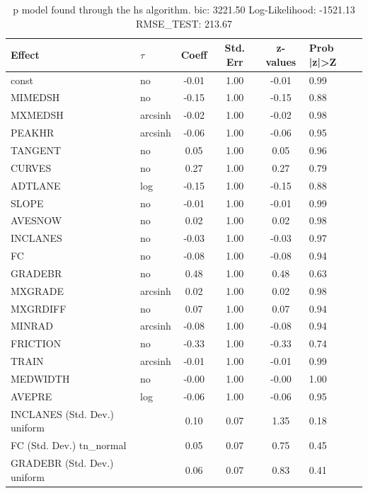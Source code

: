 \begin{table}
	\caption{p model found through the hs algorithm. bic: 3221.50 Log-Likelihood: -1521.13 RMSE_TEST: 213.67}
	\begin{center}
		\begin{tabular}{|l|l|c|c|c|l|}
			\hline
			Effect & $\tau$ & Coeff & Std. Err & z-values & Prob |z|>Z \\
			\hline
			const & no & -0.01 & 1.00 & -0.01 & 0.99 \\
			\hline
			MIMEDSH & no & -0.15 & 1.00 & -0.15 & 0.88 \\
			\hline
			MXMEDSH & arcsinh & -0.02 & 1.00 & -0.02 & 0.98 \\
			\hline
			PEAKHR & arcsinh & -0.06 & 1.00 & -0.06 & 0.95 \\
			\hline
			TANGENT & no & 0.05 & 1.00 & 0.05 & 0.96 \\
			\hline
			CURVES & no & 0.27 & 1.00 & 0.27 & 0.79 \\
			\hline
			ADTLANE & log & -0.15 & 1.00 & -0.15 & 0.88 \\
			\hline
			SLOPE & no & -0.01 & 1.00 & -0.01 & 0.99 \\
			\hline
			AVESNOW & no & 0.02 & 1.00 & 0.02 & 0.98 \\
			\hline
			INCLANES & no & -0.03 & 1.00 & -0.03 & 0.97 \\
			\hline
			FC & no & -0.08 & 1.00 & -0.08 & 0.94 \\
			\hline
			GRADEBR & no & 0.48 & 1.00 & 0.48 & 0.63 \\
			\hline
			MXGRADE & arcsinh & 0.02 & 1.00 & 0.02 & 0.98 \\
			\hline
			MXGRDIFF & no & 0.07 & 1.00 & 0.07 & 0.94 \\
			\hline
			MINRAD & arcsinh & -0.08 & 1.00 & -0.08 & 0.94 \\
			\hline
			FRICTION & no & -0.33 & 1.00 & -0.33 & 0.74 \\
			\hline
			TRAIN & arcsinh & -0.01 & 1.00 & -0.01 & 0.99 \\
			\hline
			MEDWIDTH & no & -0.00 & 1.00 & -0.00 & 1.00 \\
			\hline
			AVEPRE & log & -0.06 & 1.00 & -0.06 & 0.95 \\
			\hline
			INCLANES (Std. Dev.) uniform &  & 0.10 & 0.07 & 1.35 & 0.18 \\
			\hline
			FC (Std. Dev.) tn_normal &  & 0.05 & 0.07 & 0.75 & 0.45 \\
			\hline
			GRADEBR (Std. Dev.) uniform &  & 0.06 & 0.07 & 0.83 & 0.41 \\

\end{tabular}
\end{center}
\end{table}
